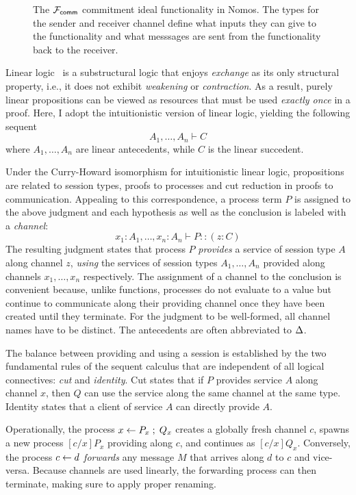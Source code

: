 \begin{figure*}[!ht]

\caption{The $\mathcal{F}_{{\mathsf {comm}}}$ commitment ideal functionality in Nomos. The types for the sender and receiver channel define what inputs they can give to the functionality and what messsages are sent from the functionality back to the receiver.}
\label{fig:nomos:commitment}
\end{figure*}


Linear logic~\cite{GirardTCS1987} is a substructural logic that enjoys
\emph{exchange} as its only structural property, i.e., it does not exhibit
\emph{weakening} or \emph{contraction}. As a result, purely linear
propositions can be viewed as resources that must be used \emph{exactly
once} in a proof. Here, I adopt the intuitionistic version of linear logic,
yielding the following sequent
\[
A_1, \ldots, A_n \vdash C
\]
where $A_1, \ldots, A_n$ are linear antecedents, while $C$ is the linear
succedent.

Under the Curry-Howard isomorphism for intuitionistic linear logic,
propositions are related to session types, proofs to processes and cut
reduction in proofs to communication. Appealing to this correspondence,
a process term $P$ is assigned to the above judgment and each hypothesis
as well as the conclusion is labeled with a \emph{channel}:
\[
x_1 : A_1, \ldots, x_n : A_n \vdash P :: (z : C)
\]
The resulting judgment states that process $P$ \emph{provides} a service
of session type $A$ along channel $z$, \emph{using} the services of session
types $A_1, \ldots, A_n$ provided along channels $x_1, \ldots, x_n$
respectively. The assignment of a channel to the conclusion is convenient
because, unlike functions, processes do not evaluate to a value but continue
to communicate along their providing channel once they have been created
until they terminate. For the judgment to be well-formed, all channel names
have to be distinct. The antecedents are often abbreviated to $\Delta$.

The balance between providing and using a session is established by the
two fundamental rules of the sequent calculus that are independent of all
logical connectives: \emph{cut} and \emph{identity}. Cut states that if
$P$ provides service $A$ along channel $x$, then $Q$ can use the service
along the same channel at the same type. Identity states that a client of
service $A$ can directly provide $A$.
Operationally, the process $x \leftarrow P_x \; ; \; Q_x$ creates a globally fresh
channel $c$, spawns a new process $[c/x]P_x$ providing along $c$, and
continues as $[c/x]Q_x$. Conversely, the process $c \leftarrow d$
\emph{forwards} any message $M$ that arrives along $d$ to $c$ and
vice-versa. Because channels are used linearly, the forwarding process
can then terminate, making sure to apply proper renaming.

